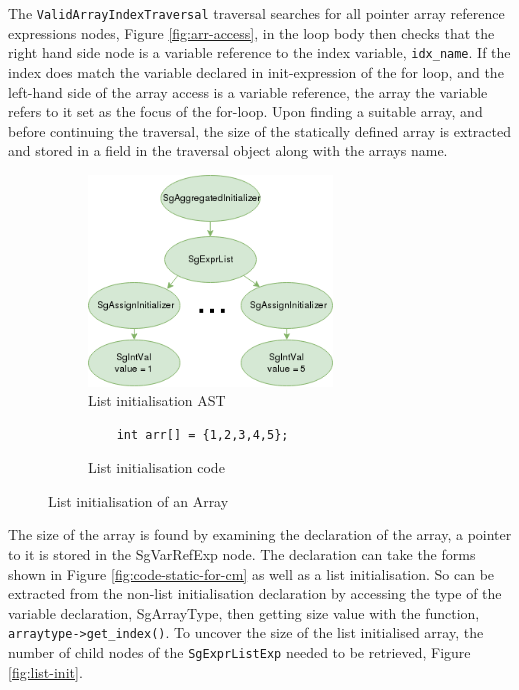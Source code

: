 \documentclass[bsc,frontabs,singlespacing,twoside,parskip,deptreport]{infthesis}
\begin{document}
The \texttt{ValidArrayIndexTraversal} traversal searches for all pointer array reference expressions nodes, Figure \ref{fig:arr-access}, in the loop body then checks that the right hand side node is a variable reference to the index variable, \texttt{idx\_name}. If the index does match the variable declared in init-expression of the for loop, and the left-hand side of the array access is a variable reference, the array the variable refers to it set as the focus of the for-loop. Upon finding a suitable array, and before continuing the traversal, the size of the statically defined array is extracted and stored in a field in the traversal object along with the arrays name. 

\begin{figure}[H]
    \begin{subfigure}[b]{0.5\textwidth}
        \centering
        \includegraphics[height=5.6cm]{images/init-list.png}
        \caption{List initialisation AST}
        \label{fig:list-init-AST-var}
    \end{subfigure}
    \hfill
    \begin{subfigure}[b]{0.5\textwidth}
        \centering
        \begin{verbatim}
    int arr[] = {1,2,3,4,5};
        \end{verbatim}
        \caption{List initialisation code}
        \label{fig:list-init-var-code}
    \end{subfigure}
    \vspace{-0.5cm}
    \caption{List initialisation of an Array}
    \label{fig:list-init-var}
\end{figure}

The size of the array is found by examining the declaration of the array, a pointer to it is stored in the SgVarRefExp node. The declaration can take the forms shown in Figure \ref{fig:code-static-for-cm} as well as a list initialisation. So  can be extracted from the non-list initialisation declaration by accessing the type of the variable declaration, SgArrayType, then getting size value with the function, \texttt{arraytype->get\_index()}. To uncover the size of the list initialised array, the number of child nodes of the \texttt{SgExprListExp} needed to be retrieved, Figure \ref{fig:list-init}. 
\end{document}
